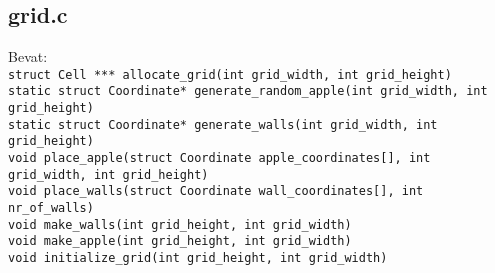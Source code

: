 \documentclass[11pt, oneside]{article}   	%
\begin{document}
\subsection{grid.c}
Bevat: \\
\texttt{struct Cell *** allocate\_grid(int grid\_width, int grid\_height)} \\
\texttt{static struct Coordinate* generate\_random\_apple(int grid\_width, int grid\_height)} \\
\texttt{static struct Coordinate* generate\_walls(int grid\_width, int grid\_height)} \\
\texttt{void place\_apple(struct Coordinate apple\_coordinates[], int grid\_width, int grid\_height)} \\
\texttt{void place\_walls(struct Coordinate wall\_coordinates[], int nr\_of\_walls)} \\
\texttt{void make\_walls(int grid\_height, int grid\_width)}\\
\texttt{void make\_apple(int grid\_height, int grid\_width)} \\
\texttt{void initialize\_grid(int grid\_height, int grid\_width)} \\
\end{document}
